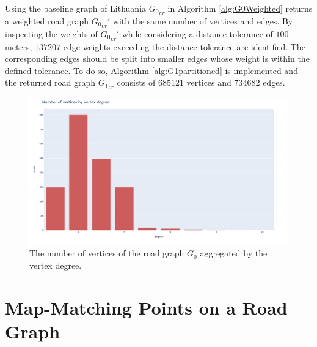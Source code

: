 \documentclass[12pt]{article}
\theoremstyle{definition}
\begin{document}
Using the baseline graph of Lithuania $G_{0_{LT}}$ in Algorithm \ref{alg:G0Weighted} returns a weighted road graph $G_{0_{LT}}'$ with the same number of vertices and edges. By inspecting the weights of $G_{0_{LT}}'$ while considering a distance tolerance of $100$ meters, $137207$ edge weights exceeding the distance tolerance are identified. The corresponding edges should be split into smaller edges whose weight is within the defined tolerance. To do so, Algorithm \ref{alg:G1partitioned} is implemented and the returned road graph $G_{1_{LT}}$ consists of $685121$ vertices and $734682$ edges. 

\begin{figure}
    \centering
    \includegraphics[width=13.5cm]{images/degreeDistribution.png}
    \caption{The number of vertices of the road graph $G_0$ aggregated by the vertex degree.}
    \label{fig:degrees}
\end{figure}

\section{Map-Matching Points on a Road Graph}\label{MapMatchingPointsOnARoadGraph}
\end{document}
